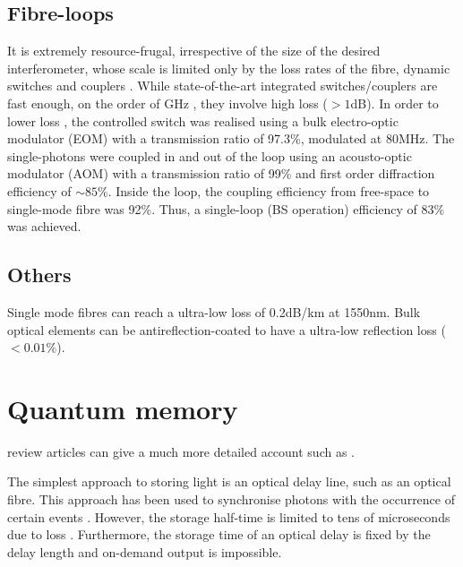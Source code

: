 %
%

\subsection{Fibre-loops}  

It is extremely resource-frugal, irrespective of the size of the desired interferometer, whose scale is limited only by the loss rates of the fibre, dynamic switches and couplers \cite{bib:motes2014}. While state-of-the-art integrated switches/couplers are fast enough, on the order of GHz \cite{bib:winzer2010, bib:schindler2014}, they involve high loss ($>1$dB). In order to lower loss \cite{bib:he2016}, the controlled switch was realised using a bulk electro-optic modulator (EOM) with a transmission ratio of 97.3\%, modulated at 80MHz. The single-photons were coupled in and out of the loop using an acousto-optic modulator (AOM) with a transmission ratio of 99\% and first order diffraction efficiency of $\sim 85\%$. Inside the loop, the coupling efficiency from free-space to single-mode fibre was 92\%. Thus, a single-loop (BS operation) efficiency of 83\% was achieved.

%
%

\subsection{Others}

Single mode fibres can reach a ultra-low loss of 0.2dB/km at 1550nm. Bulk optical elements can be antireflection-coated to have a ultra-low reflection loss ($<0.01\%$).

%
%

\section{Quantum memory} 

 review articles can give a much more detailed account such as \cite{bib:lvovsky2009optical, bib:simon2010quantum, bib:sangouard2011quantum, bib:bussieres2013prospective, bib:reiserer2015cavity}.

The simplest approach to storing light is an optical delay line, such as an optical fibre. This approach has been used to synchronise photons with the occurrence of certain events \cite{bib:landry2007quantum}. However, the storage half-time is limited to tens of microseconds due to loss \cite{bib:lvovsky2009optical}. Furthermore, the storage time of an optical delay is fixed by the delay length and on-demand output is impossible.

